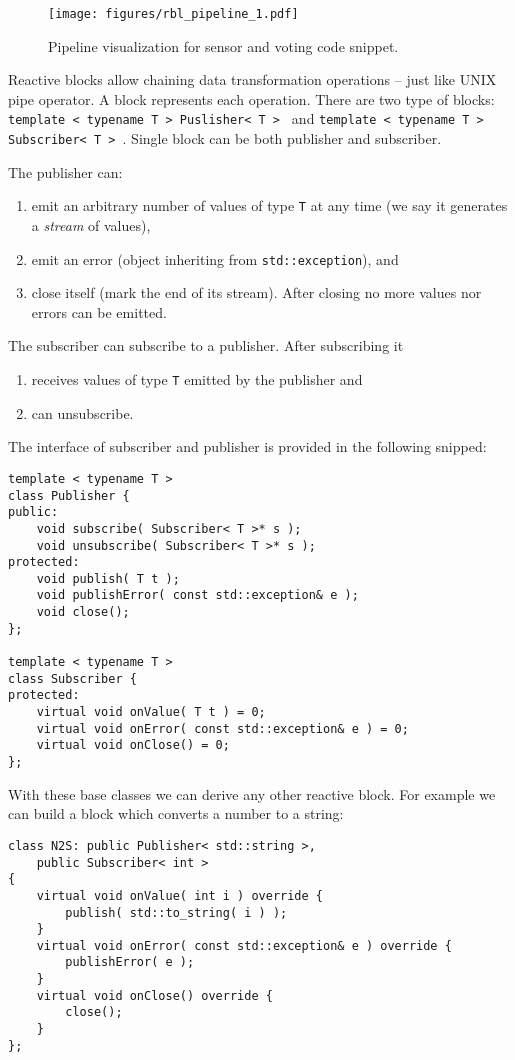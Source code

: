 \begin{figure}[!t]
    \centering
    \texttt{[image: figures/rbl\_pipeline\_1.pdf]}
    \caption{Pipeline visualization for sensor and voting code snippet.}
    \label{fig:rbl_example_1}
\end{figure}

Reactive blocks allow chaining data transformation operations -- just like UNIX
pipe operator. A block represents each operation. There are two type of blocks:
\texttt{template < typename T > Puslisher< T > } and
\texttt{template < typename T > Subscriber< T > }. Single
block can be both publisher and subscriber.

\noindent The publisher can:
\begin{enumerate}
    \item emit an arbitrary number of values of type \texttt{T} at any time (we
    say it generates a \emph{stream} of values),
    \item emit an error (object inheriting from
    \texttt{std::exception}), and
    \item close itself (mark the end of its stream). After closing no more
    values nor errors can be emitted.
\end{enumerate}

\noindent The subscriber can subscribe to a publisher. After subscribing it
\begin{enumerate}
    \item receives values of type \texttt{T} emitted by the publisher and
    \item can unsubscribe.
\end{enumerate}

The interface of subscriber and publisher is provided in the
following snipped:
\begin{verbatim}
template < typename T >
class Publisher {
public:
    void subscribe( Subscriber< T >* s );
    void unsubscribe( Subscriber< T >* s );
protected:
    void publish( T t );
    void publishError( const std::exception& e );
    void close();
};

template < typename T >
class Subscriber {
protected:
    virtual void onValue( T t ) = 0;
    virtual void onError( const std::exception& e ) = 0;
    virtual void onClose() = 0;
};
\end{verbatim}

With these base classes we can derive any other reactive block. For example we
can build a block which converts a number to a string:
\begin{verbatim}
class N2S: public Publisher< std::string >,
    public Subscriber< int >
{
    virtual void onValue( int i ) override {
        publish( std::to_string( i ) );
    }
    virtual void onError( const std::exception& e ) override {
        publishError( e );
    }
    virtual void onClose() override {
        close();
    }
};
\end{verbatim}

